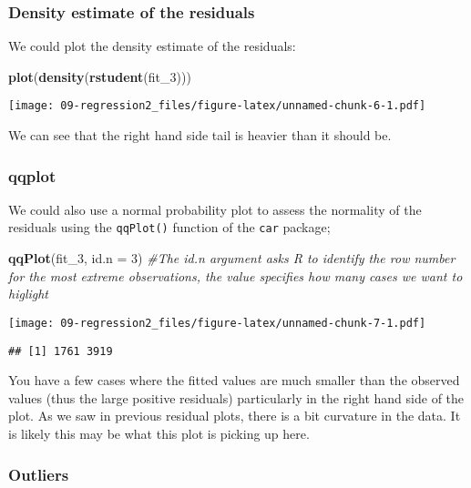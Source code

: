 \documentclass[
]{book}
\newenvironment{Shaded}{\begin{snugshade}}{\end{snugshade}}
\newcommand{\AttributeTok}[1]{\textcolor[rgb]{0.13,0.29,0.53}{#1}}
\newcommand{\CommentTok}[1]{\textcolor[rgb]{0.56,0.35,0.01}{\textit{#1}}}
\newcommand{\DecValTok}[1]{\textcolor[rgb]{0.00,0.00,0.81}{#1}}
\newcommand{\FunctionTok}[1]{\textcolor[rgb]{0.13,0.29,0.53}{\textbf{#1}}}
\newcommand{\NormalTok}[1]{#1}
\begin{document}
\subsubsection{Density estimate of the residuals}\label{density-estimate-of-the-residuals}

We could plot the density estimate of the residuals:

\begin{Shaded}
\begin{Highlighting}[]
\FunctionTok{plot}\NormalTok{(}\FunctionTok{density}\NormalTok{(}\FunctionTok{rstudent}\NormalTok{(fit\_3)))}
\end{Highlighting}
\end{Shaded}

\texttt{[image: 09-regression2\_files/figure-latex/unnamed-chunk-6-1.pdf]}

We can see that the right hand side tail is heavier than it should be.

\subsubsection{qqplot}\label{qqplot}

We could also use a normal probability plot to assess the normality of the residuals using the \texttt{qqPlot()} function of the \texttt{car} package;

\begin{Shaded}
\begin{Highlighting}[]
\FunctionTok{qqPlot}\NormalTok{(fit\_3, }\AttributeTok{id.n =} \DecValTok{3}\NormalTok{) }\CommentTok{\#The id.n argument asks R to identify the row number for the most extreme observations, the value specifies how many cases we want to higlight}
\end{Highlighting}
\end{Shaded}

\texttt{[image: 09-regression2\_files/figure-latex/unnamed-chunk-7-1.pdf]}

\begin{verbatim}
## [1] 1761 3919
\end{verbatim}

You have a few cases where the fitted values are much smaller than the observed values (thus the large positive residuals) particularly in the right hand side of the plot. As we saw in previous residual plots, there is a bit curvature in the data. It is likely this may be what this plot is picking up here.

\subsubsection{Outliers}\label{outliers}
\end{document}
